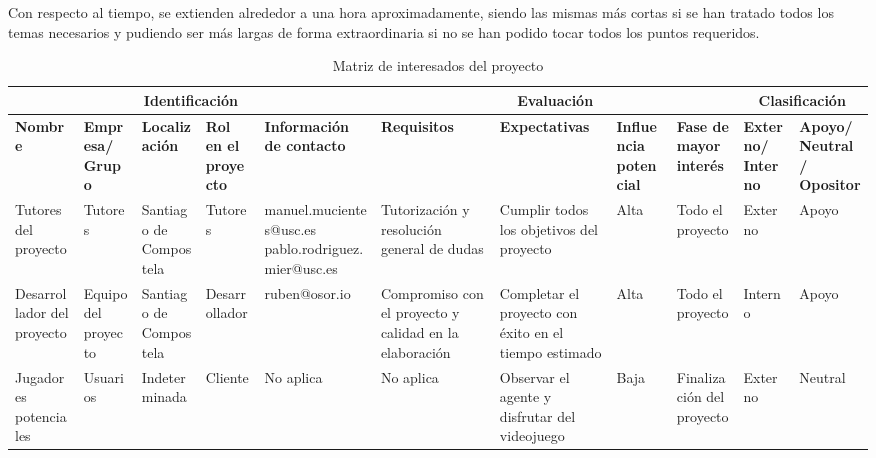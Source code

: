 \bigskip 

Con respecto al tiempo, se extienden alrededor a una hora aproximadamente, siendo las mismas más cortas si se han tratado todos los temas necesarios y pudiendo ser más largas de forma extraordinaria si no se han podido tocar todos los puntos requeridos.

\clearpage


\begin{landscape}


\begin{table}
	\begin{adjustwidth}{-3cm}{}
	{\scriptsize
		\begin{tabular}{|p{1.5cm}|p{1.5cm}|p{1.5cm}|p{1.5cm}|p{3.6cm}|p{1.5cm}|p{1.5cm}|p{1.5cm}|p{1.5cm}|p{1.5cm}|p{1.5cm}|}
			\hline
			\multicolumn{5}{c}{Identificación} &  \multicolumn{4}{c}{Evaluación} & \multicolumn{2}{c}{Clasificación}\\
			
			\hline
			\textbf{Nombre} & \textbf{Empresa/ Grupo}  & \textbf{Localización} & \textbf{Rol en el proyecto} & \textbf{Información de contacto} & \textbf{Requisitos} & \textbf{Expectativas} & \textbf{Influencia potencial} & \textbf{Fase de mayor interés} & \textbf{Externo/ Interno} & \textbf{Apoyo/ Neutral/ Opositor}\\
			
			\hline
			Tutores del proyecto & Tutores & Santiago de Compostela & Tutores & manuel.mucientes@usc.es pablo.rodriguez.mier@usc.es & Tutorización y resolución general de dudas & Cumplir todos los objetivos del proyecto & Alta & Todo el proyecto & Externo & Apoyo \\
			
			\hline
			Desarrollador del proyecto & Equipo del proyecto & Santiago de Compostela & Desarrollador & ruben@osor.io & Compromiso con el proyecto y calidad en la elaboración & Completar el proyecto con éxito en el tiempo estimado & Alta & Todo el proyecto & Interno & Apoyo \\
			
			\hline
			Jugadores potenciales & Usuarios & Indeterminada & Cliente & No aplica & No aplica & Observar el agente y disfrutar del videojuego & Baja & Finalización del proyecto & Externo & Neutral \\
			
			\hline
			
		\end{tabular}
	}
		\caption{Matriz de interesados del proyecto}
		\label{tab:interesados}
	\end{adjustwidth}
\end{table}


\end{landscape}
